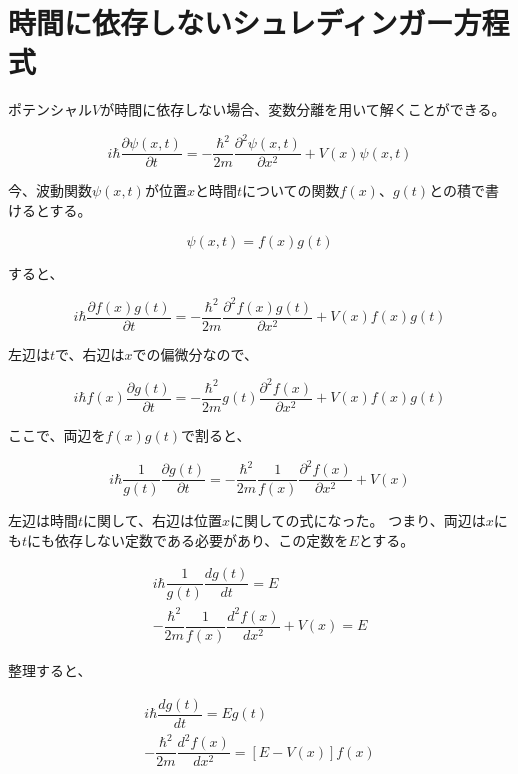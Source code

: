 \section{時間に依存しないシュレディンガー方程式}
	ポテンシャル$V$が時間に依存しない場合、変数分離を用いて解くことができる。

	\begin{equation}
	  i\hbar \dfrac{\partial \psi(x,t)}{\partial t} = - \dfrac{\hbar^2}{2m} \dfrac{\partial^2 \psi(x,t)}{\partial x^2} + V(x)\psi(x,t)
	\end{equation}

	今、波動関数$\psi(x,t)$が位置$x$と時間$t$についての関数$f(x)$、$g(t)$との積で書けるとする。

	\begin{equation}
	  \psi(x,t) = f(x)g(t)
	\end{equation}

	すると、

	\begin{equation}
	  i\hbar \dfrac{\partial f(x)g(t)}{\partial t} = - \dfrac{\hbar^2}{2m} \dfrac{\partial^2 f(x)g(t)}{\partial x^2} + V(x)f(x)g(t)
	\end{equation}

	左辺は$t$で、右辺は$x$での偏微分なので、

	\begin{equation}
	  i\hbar f(x)\dfrac{\partial g(t)}{\partial t} = - \dfrac{\hbar^2}{2m} g(t)\dfrac{\partial^2 f(x)}{\partial x^2} + V(x)f(x)g(t)
	\end{equation}

	ここで、両辺を$f(x)g(t)$で割ると、

	\begin{equation}
	  i\hbar \dfrac{1}{g(t)}\dfrac{\partial g(t)}{\partial t} = - \dfrac{\hbar^2}{2m} \dfrac{1}{f(x)}\dfrac{\partial^2 f(x)}{\partial x^2} + V(x)
	\end{equation}

	左辺は時間$t$に関して、右辺は位置$x$に関しての式になった。
	つまり、両辺は$x$にも$t$にも依存しない定数である必要があり、この定数を$E$とする。

	\begin{align}
	  i\hbar \dfrac{1}{g(t)}\dfrac{d g(t)}{d t} = E \\
	  - \dfrac{\hbar^2}{2m} \dfrac{1}{f(x)}\dfrac{d^2 f(x)}{d x^2} + V(x) = E
	\end{align}

	整理すると、

	\begin{align}
	  \label{eq.no.1}
	  i\hbar \dfrac{d g(t)}{d t} = Eg(t) \\
	  \label{eq.no.2}
	  - \dfrac{\hbar^2}{2m} \dfrac{d^2 f(x)}{d x^2} = [ E-V(x) ]f(x)
	\end{align}

